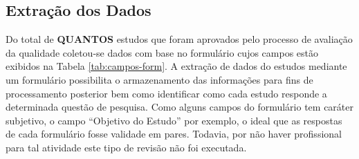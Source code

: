 \documentclass[12pt]{article}
\begin{document}
\subsection{Extração dos Dados}
\label{subsec:extracao}

Do total de \textbf{QUANTOS} estudos que foram aprovados pelo processo de
avaliação da qualidade coletou-se dados com base no formulário cujos campos
estão exibidos na Tabela \ref{tab:campos-form}. A extração de dados do estudos
mediante um formulário possibilita o armazenamento das informações para fins de
processamento posterior bem como identificar como cada estudo responde a
determinada questão de pesquisa. Como alguns campos do formulário tem caráter
subjetivo, o campo ``Objetivo do Estudo'' por exemplo, o ideal que as respostas
de cada formulário fosse validade em pares. Todavia, por não haver profissional
para tal atividade este tipo de revisão não foi executada.
\end{document}
